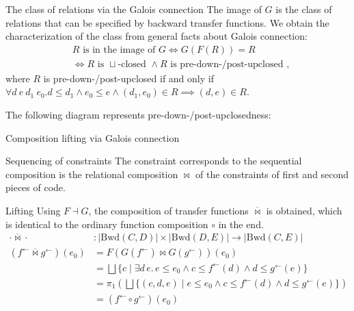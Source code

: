 \documentclass{beamer}
\newcommand{\Unidir}{\mathrm{Bwd}}
\newcommand{\fb}{{f^{\leftarrow}}}
\newcommand{\gb}{{g^{\leftarrow}}}
\newcommand{\join}{\sqcup}
\newcommand{\bigjoin}{\bigsqcup}
\newcommand{\comp}{\circ}
\newcommand{\bowtielift}{\mathbin{\overline{\bowtie}}}
\newcommand{\rotleq}{\rotatebox[origin=c]{90}{$\leq$}}
\begin{document}
\begin{frame} [fragile] {The class of relations via the Galois connection}
  The image of $G$ is the class of relations that can be specified by backward transfer functions. We obtain the characterization of the class from general facts about Galois connection:
  \begin{align*}
  &R \text{ is in the image of } G \iff G(F(R)) = R  \\
                                &\iff
                                  R \text{ is }\join \text{-closed } \land R \text{ is pre-down-/post-upclosed },
  \end{align*}
  where $R$ is pre-down-/post-upclosed if and only if $\forall d\ e\ d_{1 }\ e_{0}. d \leq d_{1} \land e_{0} \leq e \land (d_{1}, e_{0}) \in R \implies (d, e) \in R$.

  The following diagram represents pre-down-/post-upclosedness:
  \begin{center}
  \end{center}
\end{frame}
\begin{frame} {Composition lifting via Galois connection}
  \begin{block}{Sequencing of constraints}
    The constraint corresponds to the sequential composition is the relational composition $\bowtie$ of the constraints of first and second pieces of code.
  \end{block}
  \begin{block}{Lifting}
    Using $F \dashv G$, the composition of transfer functions $\bowtielift$ is obtained, which is identical to the ordinary function composition $\comp$ in the end.
    \begin{align*}
      \cdot \bowtielift \cdot &: \left| \Unidir(C, D) \right| \times  \left| \Unidir(D, E) \right| \to  \left| \Unidir(C, E) \right| \\
      (\fb \bowtielift \gb) (e_{0}) &= F(G(\fb) \bowtie G(\gb)) (e_{0}) \\
                                  &= \bigjoin \{ c \mid \exists d\, e.\,e \leq e_{0} \land c \leq \fb(d) \land d \leq \gb(e) \} \\
                                  &= \pi_{1} (\bigjoin \{ (c, d , e) \mid e \leq e_{0} \land c \leq \fb(d) \land d \leq \gb(e) \}) \\
                                  &= (\fb \comp \gb)(e_{0})
    \end{align*}
  \end{block}
\end{frame}
\end{document}
